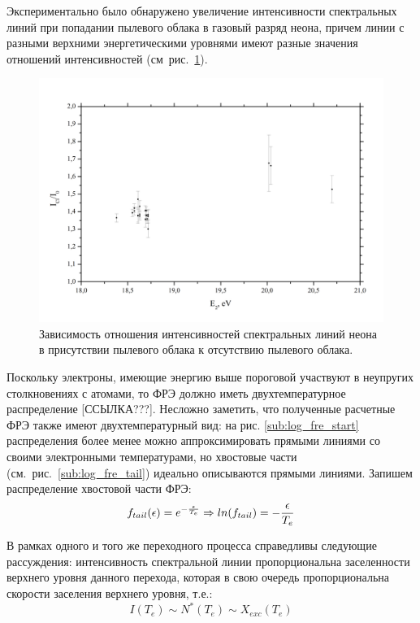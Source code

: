 Экспериментально было обнаружено увеличение интенсивности спектральных линий при попадании пылевого облака
в газовый разряд неона, причем линии с разными верхними энергетическими уровнями имеют разные значения
отношений интенсивностей (см~рис.~\ref{fig:fig35}).
\begin{figure}
    \centering
    \includegraphics[width=15cm]{figures/fig35}
    \caption{Зависимость отношения интенсивностей спектральных линий неона в присутствии пылевого облака к отсутствию пылевого облака.}
    \label{fig:fig35}
\end{figure}



Поскольку электроны, имеющие энергию выше пороговой участвуют в неупругих столкновениях с атомами, то ФРЭ должно иметь
двухтемпературное распределение [ССЫЛКА???]. Несложно заметить, что полученные расчетные ФРЭ также имеют двухтемпературный вид:
на рис. {\ref{sub:log_fre_start}} распределения более менее можно аппроксимировать прямыми линиями со своими электронными
температурами, но хвостовые части (см.~рис.~\ref{sub:log_fre_tail}) идеально описываются прямыми линиями. Запишем распределение хвостовой части ФРЭ:
\begin{equation}
    f_{tail}(\epsilon) = e^{-{\epsilon \over T_e}} \Rightarrow ln(f_{tail}) = - {\epsilon \over T_e}
    \label{eq:tail}
\end{equation}

В рамках одного и того же переходного процесса справедливы следующие рассуждения: интенсивность
спектральной линии пропорциональна заселенности верхнего уровня данного перехода, которая в свою очередь
пропорциональна скорости заселения верхнего уровня, т.е.:
\begin{equation}
I(T_e) \sim N^*(T_e) \sim X_{exc}(T_e)  %
\label{eq:sim_Te}
\end{equation}

